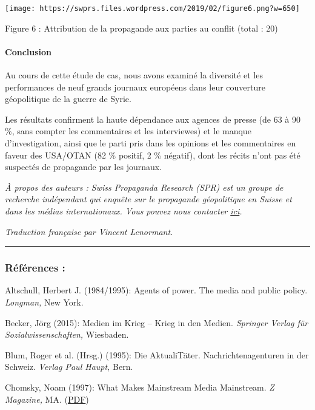 \texttt{[image: https://swprs.files.wordpress.com/2019/02/figure6.png?w=650]}

Figure 6 : Attribution de la propagande aux parties au conflit (total :
20)

\hypertarget{conclusion}{%
\paragraph{Conclusion}\label{conclusion}}

Au cours de cette étude de cas, nous avons examiné la diversité et les
performances de neuf grands journaux européens dans leur couverture
géopolitique de la guerre de Syrie.

Les résultats confirment la haute dépendance aux agences de presse (de
63 à 90 \%, sans compter les commentaires et les interviewes) et le
manque d'investigation, ainsi que le parti pris dans les opinions et les
commentaires en faveur des USA/OTAN (82 \% positif, 2 \% négatif), dont
les récits n'ont pas été suspectés de propagande par les journaux.

\emph{À propos des auteurs : Swiss Propaganda Research (SPR) est un
groupe de recherche indépendant} \emph{qui enquête sur le propagande
géopolitique en Suisse et dans les médias internationaux. Vous}
\emph{pouvez nous contacter \href{https://swprs.org/contact/}{ici}.}

\emph{Traduction française par Vincent Lenormant.}

\begin{center}\rule{0.5\linewidth}{\linethickness}\end{center}

\hypertarget{ruxe9fuxe9rences-}{%
\subsubsection{Références :}\label{ruxe9fuxe9rences-}}

Altschull, Herbert J. (1984/1995): Agents of power. The media and public
policy. \emph{Longman,} New York.

Becker, Jörg (2015): Medien im Krieg -- Krieg in den Medien.
\emph{Springer Verlag für Sozialwissenschaften,} Wiesbaden.

Blum, Roger et al. (Hrsg.) (1995): Die AktualiTäter.
Nachrichtenagenturen in der Schweiz. \emph{Verlag Paul Haupt,} Bern.

Chomsky, Noam (1997): What Makes Mainstream Media Mainstream. \emph{Z
Magazine,} MA. (\href{https://chomsky.info/199710__/}{PDF})

